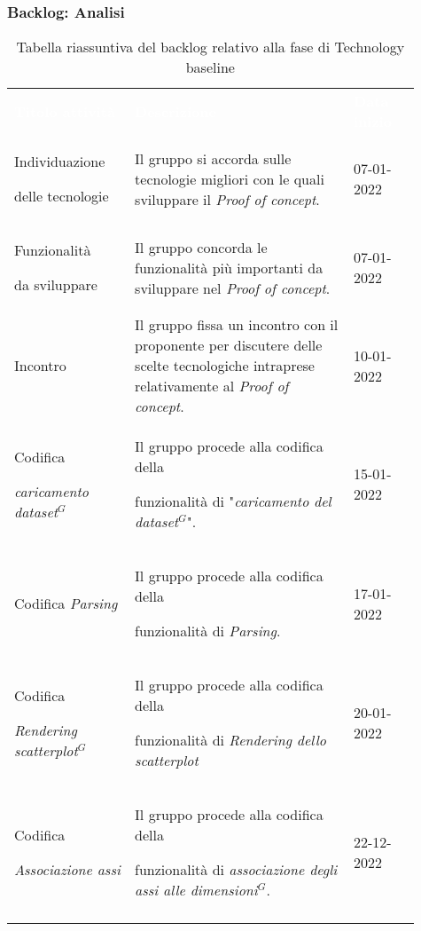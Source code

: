 \subsubsection{Backlog: Analisi}
{\renewcommand{\arraystretch}{1.5}
\begin{longtable}{p{0.27\linewidth}p{0.49\linewidth}p{0.15\linewidth}}
	\rowcolor[RGB]{33, 73, 50}
	\textcolor{white}{\textbf{Titolo attività}} & \textcolor{white}{\textbf{Descrizione}} & \textcolor{white}{\textbf{Data inizio}}\\
    
    \rowcolor[RGB]{216, 235, 171}
    Individuazione \par delle tecnologie & Il gruppo si accorda sulle tecnologie migliori con le quali sviluppare il \textit{Proof of concept}. & 07-01-2022\\

    \rowcolor[RGB]{233, 245, 206}
    Funzionalità \par da sviluppare & Il gruppo concorda le funzionalità più importanti da sviluppare nel \textit{Proof of concept}. & 07-01-2022\\

    \rowcolor[RGB]{216, 235, 171}
    Incontro & Il gruppo fissa un incontro con il proponente per discutere delle scelte tecnologiche intraprese relativamente al \textit{Proof of concept}. & 10-01-2022\\

    \rowcolor[RGB]{233, 245, 206}
    Codifica \par \textit{caricamento dataset$^{G}$} & Il gruppo procede alla codifica della \par funzionalità di "\textit{caricamento del dataset$^{G}$}". & 15-01-2022\\

    \rowcolor[RGB]{216, 235, 171}
    Codifica \textit{Parsing} & Il gruppo procede alla codifica della \par funzionalità di \textit{Parsing}. & 17-01-2022\\

    \rowcolor[RGB]{233, 245, 206}
    Codifica \par \textit{Rendering scatterplot$^{G}$} & Il gruppo procede alla codifica della \par funzionalità di \textit{Rendering dello scatterplot} & 20-01-2022\\

    \rowcolor[RGB]{216, 235, 171}
    Codifica \par \textit{Associazione assi} & Il gruppo procede alla codifica della \par funzionalità di \textit{associazione degli assi alle dimensioni$^{G}$}. & 22-12-2022\\

    

    \caption{Tabella riassuntiva del backlog relativo alla fase di Technology baseline}
\end{longtable}	
}